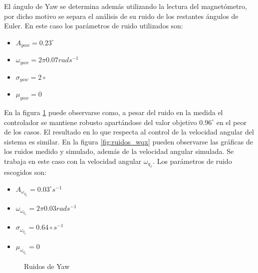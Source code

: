 \documentclass[main]{subfiles}
\begin{document}
El \'angulo de Yaw se determina adem\'as utilizando la lectura del magnet\'ometro, por dicho motivo se separa el an\'alisis de su ruido de los restantes \'angulos de Euler. En este caso los par\'ametros de ruido utilizados son:

\begin{itemize}
\item $A_{yaw} = 0.23^\circ$
\item $\omega_{yaw} = 2\pi 0.07 rad s^{-1}$
\item $\sigma_{yaw} = 2\circ$
\item $\mu_{yaw} = 0$
\end{itemize}

En la figura \ref{fig:ruidos_yaw} puede observarse como, a pesar del ruido en la medida el controlador se mantiene robusto apart\'andose del valor objetivo $0.96^\circ$ en el peor de los casos. El resultado en lo que respecta al control de la velocidad angular del sistema es similar. En la figura \ref{fig:ruidos_wqx} pueden observarse las gr\'aficas de los ruidos medido y simulado, adem\'as de la velocidad angular simulada. Se trabaja en este caso con la velocidad angular $\omega_{q_x}$. Los par\'ametros de ruido escogidos son:
\begin{itemize}
\item $A_{\omega_{q_x}} = 0.03^\circ s^{-1}$
\item $\omega_{\omega_{q_x}} = 2\pi 0.03 rad s^{-1}$
\item $\sigma_{\omega_{q_x}} = 0.64\circ s^{-1}$
\item $\mu_{\omega_{q_x}} = 0$
\end{itemize}
\begin{figure}[h!]
  \centering
  \caption{Ruidos de Yaw}
  \label{fig:ruidos_yaw}
\end{figure}
\end{document}
